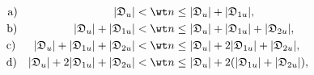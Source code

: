 \vskip 2cm












\label{end}











\begin{equation}


\begin{split}


\text{a)}\, \ \qquad\qquad\qquad\qquad |\frak D_u|&<\wt n \le|\frak D_u|+|\frak D_{1u}|,\\


\text{b)}\qquad\qquad\quad |\frak D_u|+|\frak D_{1u}|&<\wt n \le


|\frak D_u|+|\frak D_{1u}|+|\frak D_{2u}|,\\


\text{c)}\quad\ \; |\frak D_u|+|\frak D_{1u}|+


|\frak D_{2u}|&<\wt n \le|\frak D_u|+2|\frak D_{1u}|+|\frak D_{2u}|,\\


\text{d)}\quad |\frak D_u|+2|\frak D_{1u}|+


|\frak D_{2u}|&<\wt n \le|\frak D_u|+


2(|\frak D_{1u}|+|\frak D_{2u}|),


\end{split}


\label{(17.17)}


\end{equation}


